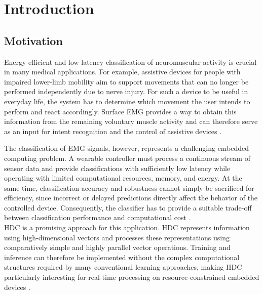 \chapter{Introduction}
\section{Motivation}

Energy-efficient and low-latency classification of neuromuscular activity is crucial in many medical applications. For example, assistive devices for people with impaired lower-limb mobility aim to support movements that can no longer be performed independently due to nerve injury. For such a device to be useful in everyday life, the system has to determine which movement the user intends to perform and react accordingly. Surface \ac{EMG} provides a way to obtain this information from the remaining voluntary muscle activity and can therefore serve as an input for intent recognition and the control of assistive devices \cite{cimolato_emg-driven_2022}.

The classification of \ac{EMG} signals, however, represents a challenging embedded computing problem. A wearable controller must process a continuous stream of sensor data and provide classifications with sufficiently low latency while operating with limited computational resources, memory, and energy. At the same time, classification accuracy and robustness cannot simply be sacrificed for efficiency, since incorrect or delayed predictions directly affect the behavior of the controlled device. Consequently, the classifier has to provide a suitable trade-off between classification performance and computational cost \cite{castruita-lopez_electromyography_2025}.\\

\ac{HDC} is a promising approach for this application. \ac{HDC} represents information using high-dimensional vectors and processes these representations using comparatively simple and highly parallel vector operations. Training and inference can therefore be implemented without the complex computational structures required by many conventional learning approaches, making HDC particularly interesting for real-time processing on resource-constrained embedded devices \cite{thomas_theoretical_2021}.

